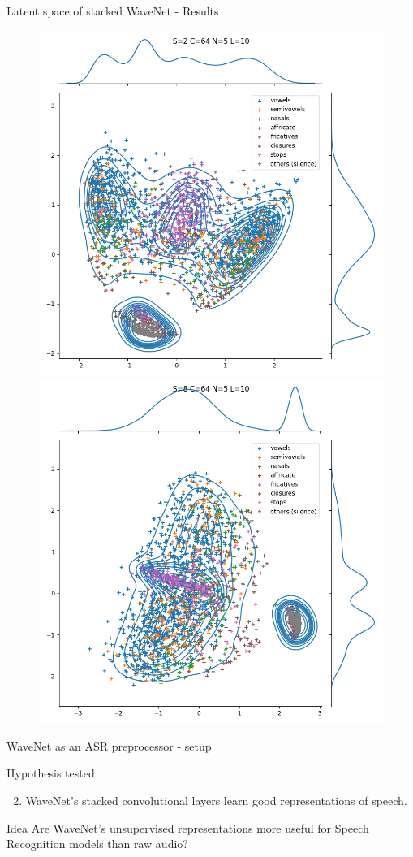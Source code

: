 \documentclass[
  ignorenonframetext,
  aspectratio=169,
]{beamer}
\providecommand{\tightlist}{%
  \setlength{\itemsep}{0pt}\setlength{\parskip}{0pt}}
\begin{document}
\begin{frame}{Latent space of stacked WaveNet - Results}
\protect\hypertarget{latent-space-of-stacked-wavenet---results}{}
\begin{figure}
\includegraphics[width=0.5\columnwidth]{ 
        gfx/latent_exploration_PCA_S=2_C=64_N=5_L=10.png}%
\includegraphics[width=0.5\columnwidth]{
        gfx/latent_exploration_PCA_S=8_C=64_N=5_L=10.png
        }%
\end{figure}
\end{frame}

\begin{frame}{WaveNet as an ASR preprocessor - setup}
\protect\hypertarget{wavenet-as-an-asr-preprocessor---setup}{}
\begin{block}{Hypothesis tested}
\protect\hypertarget{hypothesis-tested-2}{}
\begin{enumerate}[<+->]
\setcounter{enumi}{1}
\tightlist
\item
  WaveNet's stacked convolutional layers learn good representations of
  speech.
\end{enumerate}
\end{block}

\begin{block}{Idea}
\protect\hypertarget{idea}{}
Are WaveNet's unsupervised representations more useful for Speech
Recognition models than raw audio?
\end{block}
\end{frame}
\end{document}
